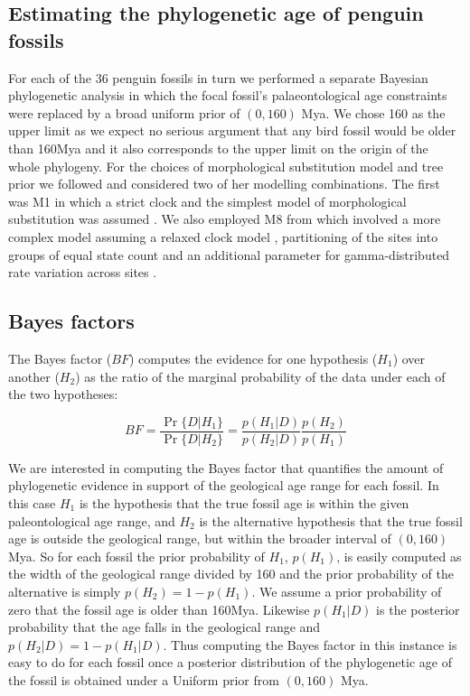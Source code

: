 \documentclass[11pt]{article}
\newcommand{\Mstrict}{{M1}}
\newcommand{\Mrelaxed}{{M8}}
\begin{document}
\subsection*{Estimating the phylogenetic age of penguin fossils}

For each of the 36 penguin fossils in turn we performed a separate Bayesian phylogenetic analysis in which the focal fossil's palaeontological age constraints were replaced by a broad uniform prior of $(0,160)$ Mya. We chose 160 as the upper limit as we expect no serious argument that any bird fossil would be older than 160Mya and it also corresponds to the upper limit on the origin of the whole phylogeny. For the choices of morphological substitution model and tree prior we followed \textcite{gavryushkina2015bayesian} and considered two of her modelling combinations. The first was \Mstrict{} in which a strict clock and the simplest model of morphological substitution was assumed \autocite{Lewis2001}. We also employed \Mrelaxed{} from \textcite{gavryushkina2015bayesian} which involved a more complex model assuming a relaxed clock model \autocite{Drummond2006}, partitioning of the sites into groups of equal state count and an additional parameter for gamma-distributed rate variation across sites \autocite{yang:1994ma}.

\subsection*{Bayes factors}

The Bayes factor ($BF$) computes the evidence for one hypothesis ($H_1$) over another ($H_2$) as the ratio of the marginal probability of the data under each of the two hypotheses:

\begin{equation}
BF = \frac{\Pr\{D|H_1\}}{\Pr\{D|H_2\}} = \frac{p(H_1|D)}{p(H_2|D)}\frac{p(H_2)}{p(H_1)}
\end{equation}

We are interested in computing the Bayes factor that quantifies the amount of phylogenetic evidence in support of the geological age range for each fossil. In this case $H_1$ is the hypothesis that the true fossil age is within the given paleontological age range, and $H_2$ is the alternative hypothesis that the true fossil age is outside the geological range, but within the broader interval of $(0,160)$ Mya. So for each fossil the prior probability of $H_1$, $p(H_1)$, is easily computed as the width of the geological range divided by 160 and the prior probability of the alternative is simply $p(H_2) = 1 - p(H_1)$. We assume a prior probability of zero that the fossil age is older than 160Mya. Likewise $p(H_1 | D)$ is the posterior probability that the age falls in the geological range and $p(H_2 | D) = 1 - p(H_1 | D)$. Thus computing the Bayes factor in this instance is easy to do for each fossil once a posterior distribution of the phylogenetic age of the fossil is obtained under a Uniform prior from $(0,160)$ Mya.
\end{document}
